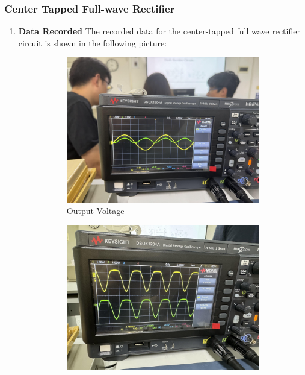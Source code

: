     \subsubsection{Center Tapped Full-wave Rectifier}
    \begin{enumerate}[I]
        \item \textbf{Data Recorded}\newline
            The recorded data for the center-tapped full wave rectifier circuit is shown in the following picture:
            \begin{figure}[h]
                \centering
                \begin{subfigure}[h]{0.4\textwidth}
                    \centering
                    \includegraphics[width=1\textwidth]{Experiment_03/Images/3.4_outPutVoltage.jpg}
                    \caption{Output Voltage}
                    \label{wave:3.4OV}
                \end{subfigure}
                \begin{subfigure}[h]{0.4\textwidth}
                    \centering
                    \includegraphics[width=1\textwidth]{Experiment_03/Images/3.4_diodeVoltage.jpg}

\end{subfigure}
\end{figure}
\end{enumerate}
